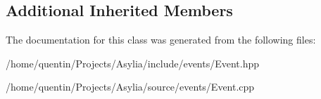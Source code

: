 \subsection*{Additional Inherited Members}


The documentation for this class was generated from the following files\-:\begin{DoxyCompactItemize}
\item 
/home/quentin/\-Projects/\-Asylia/include/events/Event.\-hpp\item 
/home/quentin/\-Projects/\-Asylia/source/events/Event.\-cpp\end{DoxyCompactItemize}
